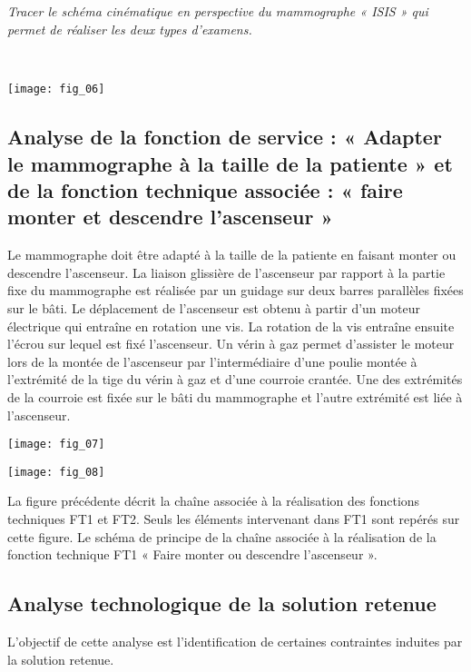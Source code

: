 \begin{multicols}{2}
\subparagraph{}\textit{Tracer le schéma cinématique en
perspective du mammographe « ISIS »
qui permet de réaliser les deux types
d’examens.}
\ifprof
\begin{corrige}~\\
\end{corrige}
\else
\fi

\begin{center}
\texttt{[image: fig\_06]}
\end{center}

\subsection*{Analyse de la fonction de service : « Adapter le
mammographe à la taille de la patiente » et de la fonction
technique associée : « faire monter et descendre
l’ascenseur »}

Le mammographe doit être adapté à la taille de la patiente en faisant monter
ou descendre l’ascenseur. La liaison glissière de l’ascenseur par rapport à la partie
fixe du mammographe est réalisée par un guidage sur deux barres parallèles
fixées sur le bâti. Le déplacement de l’ascenseur est obtenu à partir d’un moteur
électrique qui entraîne en rotation une vis. La rotation de la vis entraîne ensuite
l’écrou sur lequel est fixé l’ascenseur.
Un vérin à gaz permet d’assister le moteur lors de la montée de l’ascenseur par
l’intermédiaire d’une poulie montée à l’extrémité de la tige du vérin à gaz et
d’une courroie crantée. Une des extrémités de la courroie est fixée sur le bâti du
mammographe et l’autre extrémité est liée à l’ascenseur.

\begin{center}
\texttt{[image: fig\_07]}
\end{center}

\begin{center}
\texttt{[image: fig\_08]}
\end{center}


La figure précédente décrit la chaîne associée à la réalisation des fonctions techniques
FT1 et FT2. Seuls les éléments intervenant dans FT1 sont repérés sur cette
figure. Le schéma de principe de la chaîne associée à la
réalisation de la fonction technique FT1 « Faire monter ou descendre
l’ascenseur ».

\subsection*{Analyse technologique de la solution retenue}
\begin{obj}
L’objectif de cette analyse est l’identification de certaines contraintes induites
par la solution retenue.
\end{obj}


\end{multicols}
